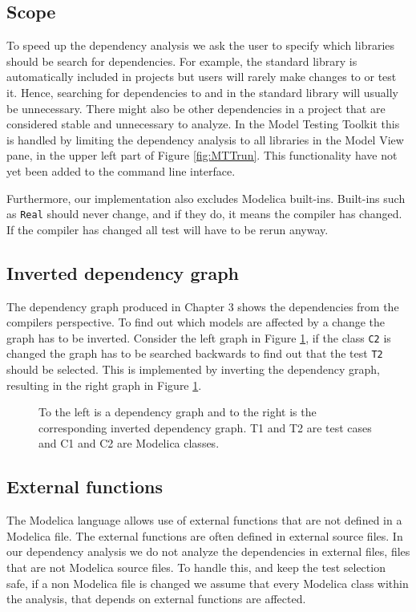 \documentclass{cslthse-msc}
\begin{document}
\subsection{Scope}
To speed up the dependency analysis we ask the user to specify which libraries should be search for dependencies. For example, the standard library is automatically included in projects but users will rarely make changes to or test it. Hence, searching for dependencies to and in the standard library will usually be unnecessary. There might also be other dependencies in a project that are considered stable and unnecessary to analyze. In the Model Testing Toolkit this is handled by limiting the dependency analysis to all libraries in the Model View pane, in the upper left part of Figure \ref{fig:MTTrun}. This functionality have not yet been added to the command line interface.

Furthermore, our implementation also excludes Modelica built-ins. Built-ins such as \texttt{Real} should never change, and if they do, it means the compiler has changed. If the compiler has changed all test will have to be rerun anyway.

\subsection{Inverted dependency graph}
The dependency graph produced in Chapter 3 shows the dependencies from the compilers perspective. To find out which models are affected by a change the graph has to be inverted. Consider the left graph in Figure \ref{fig:invertedGraph}, if the class \texttt{C2} is changed the graph has to be searched backwards to find out that the test \texttt{T2} should be selected. This is implemented by inverting the dependency graph, resulting in the right graph in Figure \ref{fig:invertedGraph}.

\begin{figure}[!htbp]
    \centering
    \qquad
    \caption{To the left is a dependency graph and to the right is the corresponding inverted dependency graph. T1 and T2 are test cases and C1 and C2 are Modelica classes.}
    \label{fig:invertedGraph}
\end{figure}

\subsection{External functions}
The Modelica language allows use of external functions that are not defined in a Modelica file. The external functions are often defined in external source files\cite{modelicamodelica}. In our dependency analysis we do not analyze the dependencies in external files, files that are not Modelica source files. To handle this, and keep the test selection safe, if a non Modelica file is changed we assume that every Modelica class within the analysis, that depends on external functions are affected.
\end{document}
